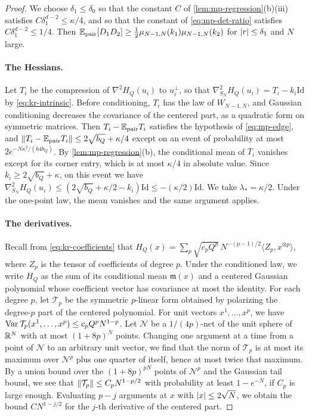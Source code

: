 \begin{proof}
We choose $\delta_1\le\delta_0$ so that the constant $C$ of \cref{lem:mp-regression}(b)(iii) satisfies $C\delta_1^{d-2}\le\kappa/4$, and so that the constant of \eqref{eq:mp-det-ratio} satisfies $C\delta_1^{d-2}\le1/4$. Then $\mathbb E_{\mathrm{pair}}[D_1D_2]\ge\frac12\mu_{N-1,N}(k_1)\mu_{N-1,N}(k_2)$ for $\left|r\right|\le\delta_1$ and $N$ large.

\paragraph{The Hessians.}
Let $T_i$ be the compression of $\nabla^2H_Q(u_i)$ to $u_i^\perp$, so that $\nabla^2_{S_N}H_Q(u_i)=T_i-k_i\mathrm{Id}$ by \eqref{eq:kr-intrinsic}. Before conditioning, $T_i$ has the law of $W_{N-1,N}$, and Gaussian conditioning decreases the covariance of the centered part, as a quadratic form on symmetric matrices. Then $T_i-\mathbb E_{\mathrm{pair}}T_i$ satisfies the hypothesis of \eqref{eq:mp-edge}, and $\left\lVert T_i-\mathbb E_{\mathrm{pair}}T_i\right\rVert\le2\sqrt{b_Q}+\kappa/4$ except on an event of probability at most $2e^{-N\kappa^2/(64b_Q)}$. By \cref{lem:mp-regression}(b), the conditional mean of $T_i$ vanishes except for its corner entry, which is at most $\kappa/4$ in absolute value. Since $k_i\ge2\sqrt{b_Q}+\kappa$, on this event we have $\nabla^2_{S_N}H_Q(u_i)\le(2\sqrt{b_Q}+\kappa/2-k_i)\mathrm{Id}\le-(\kappa/2)\mathrm{Id}$. We take $\lambda_*=\kappa/2$. Under the one-point law, the mean vanishes and the same argument applies.

\paragraph{The derivatives.}
Recall from \eqref{eq:kr-coefficients} that $H_Q(x)=\sum_p\sqrt{c_pQ^p}\,N^{-(p-1)/2}\langle Z_p,x^{\otimes p}\rangle$, where $Z_p$ is the tensor of coefficients of degree $p$. Under the conditioned law, we write $H_Q$ as the sum of its conditional mean $\mathfrak m(x)$ and a centered Gaussian polynomial whose coefficient vector has covariance at most the identity. For each degree $p$, let $\mathcal T_p$ be the symmetric $p$-linear form obtained by polarizing the degree-$p$ part of the centered polynomial. For unit vectors $x^1,\dots,x^p$, we have $\operatorname{Var}\mathcal T_p(x^1,\dots,x^p)\le c_pQ^pN^{1-p}$. Let $\mathcal N$ be a $1/(4p)$-net of the unit sphere of $\mathbb R^N$ with at most $(1+8p)^N$ points. Changing one argument at a time from a point of $\mathcal N$ to an arbitrary unit vector, we find that the norm of $\mathcal T_p$ is at most its maximum over $\mathcal N^p$ plus one quarter of itself, hence at most twice that maximum. By a union bound over the $(1+8p)^{pN}$ points of $\mathcal N^p$ and the Gaussian tail bound, we see that $\left\lVert\mathcal T_p\right\rVert\le C_pN^{1-p/2}$ with probability at least $1-e^{-N}$, if $C_p$ is large enough. Evaluating $p-j$ arguments at $x$ with $\left|x\right|\le2\sqrt N$, we obtain the bound $CN^{1-j/2}$ for the $j$-th derivative of the centered part.


\end{proof}
